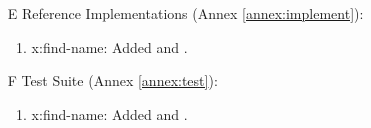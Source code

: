 \begin{itemize}
	\item[E] Reference Implementations (Annex \ref{annex:implement}): %
	\begin{enumerate}
		\item \textsf{x:find-name:} Added  and .
	\end{enumerate}

	\item[F] Test Suite (Annex \ref{annex:test}):	%
	\begin{enumerate}
		\item \textsf{x:find-name:} Added  and .
	\end{enumerate}
\end{itemize}


